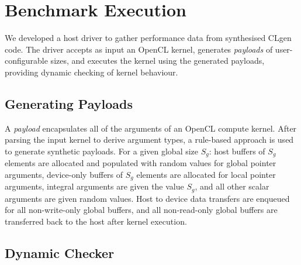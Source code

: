 \section{Benchmark Execution}
\label{sec:cldrive}

We developed a host driver to gather performance data from synthesised CLgen code. The driver accepts as input an OpenCL kernel, generates \emph{payloads} of user-configurable sizes, and executes the kernel using the generated payloads, providing dynamic checking of kernel behaviour.

\subsection{Generating Payloads}

A \emph{payload} encapsulates all of the arguments of an OpenCL compute kernel. After parsing the input kernel to derive argument types, a rule-based approach is used to generate synthetic payloads. For a given global size $S_g$: host buffers of $S_g$ elements are allocated and populated with random values for global pointer arguments, device-only buffers of $S_g$ elements are allocated for local pointer arguments, integral arguments are given the value $S_g$, and all other scalar arguments are given random values. Host to device data transfers are enqueued for all non-write-only global buffers, and all non-read-only global buffers are transferred back to the host after kernel execution.

\subsection{Dynamic Checker}

